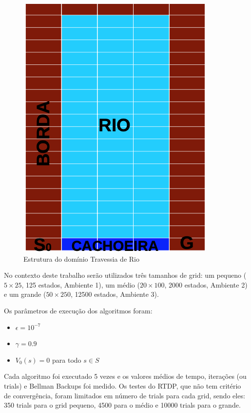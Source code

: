 \documentclass[letterpaper]{article}
\begin{document}
\begin{figure}[t]
    \centering
    \includegraphics[width=0.9\columnwidth]{river-traversal}
    \caption{Estrutura do domínio Travessia de Rio}
    \label{fig:river-traversal-scheme}
\end{figure}

No contexto deste trabalho serão utilizados três tamanhos de grid: um pequeno ($5 \times 25$, 125 estados, Ambiente 1), um médio ($20 \times 100$, 2000 estados, Ambiente 2) e um grande ($50 \times 250$, 12500 estados, Ambiente 3).

Os parâmetros de execução dos algoritmos foram:

\begin{itemize}
    \item $ \epsilon = 10^{-7} $
    \item $\gamma = 0.9$
    \item $ V_0(s) = 0$ para todo $ s \in S $
\end{itemize}

Cada algoritmo foi executado 5 vezes e os valores médios de tempo, iterações (ou trials) e Bellman Backups foi medido. Os testes do RTDP, que não tem critério de convergência, foram limitados em número de trials para cada grid, sendo eles: 350 trials para o grid pequeno, 4500 para o médio e 10000 trials para o grande.
\end{document}
